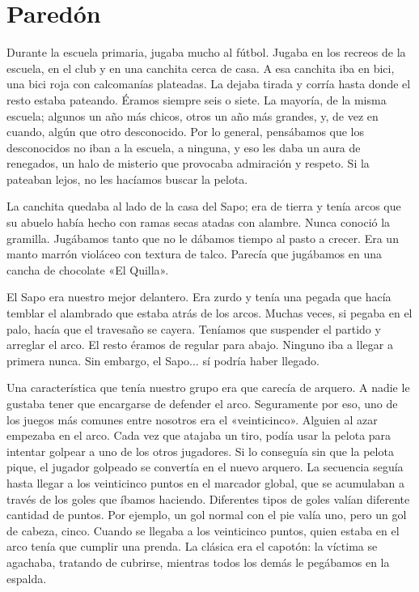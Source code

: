 \documentclass[11pt,twoside,openright]{book}
\begin{document}
\chapter*{Paredón}  
 Durante la escuela primaria, jugaba mucho al fútbol. Jugaba en los recreos de
 la escuela, en el club y en una canchita cerca de casa. A esa canchita iba en
 bici, una bici roja con calcomanías plateadas. La dejaba tirada y corría hasta
 donde el resto estaba pateando. Éramos siempre seis o siete. La mayoría, de la
 misma escuela; algunos un año más chicos, otros un año más grandes, y, de vez
 en cuando, algún que otro desconocido. Por lo general,  pensábamos que los
 desconocidos no iban a la escuela, a ninguna, y eso les daba un aura de
 renegados, un halo de misterio que provocaba admiración y respeto. Si la
 pateaban lejos, no les hacíamos buscar la pelota.
 
 La canchita quedaba al lado de la casa del Sapo; era de tierra y tenía arcos
 que su abuelo había hecho con ramas secas atadas con alambre. Nunca conoció la
 gramilla. Jugábamos tanto que no le dábamos tiempo al pasto a crecer. Era un
 manto marrón violáceo con textura de talco. Parecía que jugábamos en una cancha
 de chocolate «El Quilla».
 
 El Sapo era nuestro mejor delantero. Era zurdo y tenía una pegada que hacía
 temblar el alambrado que estaba atrás de los arcos. Muchas veces, si pegaba en
 el palo, hacía que el travesaño se cayera. Teníamos que suspender el partido y
 arreglar el arco. El resto éramos de regular para abajo. Ninguno iba a llegar a
 primera nunca. Sin embargo, el Sapo... sí podría haber llegado.
 
 Una característica que tenía nuestro grupo era que carecía de arquero. A nadie
 le gustaba tener que encargarse de defender el arco. Seguramente por eso, uno
 de los juegos más comunes entre nosotros era el «veinticinco». Alguien al azar
 empezaba en el arco. Cada vez que atajaba un tiro, podía usar la pelota para
 intentar golpear a uno de los otros jugadores. Si lo conseguía sin que la
 pelota pique, el jugador golpeado se convertía en el nuevo arquero. La
 secuencia seguía hasta llegar a los veinticinco puntos en el marcador global,
 que se acumulaban a través de los goles que íbamos haciendo. Diferentes tipos
 de goles valían diferente cantidad de puntos. Por ejemplo, un gol normal con el
 pie valía uno, pero un gol de cabeza, cinco. Cuando se llegaba a los
 veinticinco puntos, quien estaba en el arco tenía que cumplir una prenda. La
 clásica era el capotón: la víctima se agachaba, tratando de cubrirse, mientras
 todos los demás le pegábamos en la espalda.
 
\end{document}
